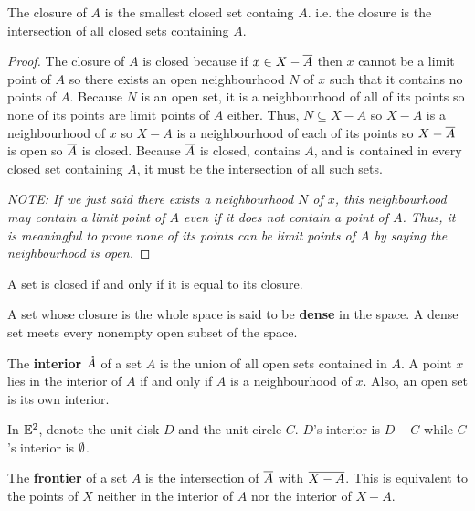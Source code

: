 \begin{theorem}
    The closure of $A$ is the smallest closed set containg $A$. i.e. the closure is the intersection of all closed sets containing $A$.
\end{theorem}
\begin{proof}
    The closure of $A$ is closed because if $x \in X-\overline{A}$ then $x$ cannot be a limit point of $A$ so there exists an open neighbourhood $N$ of $x$ such that it contains no points of $A$. Because $N$ is an open set, it is a neighbourhood of all of its points so none of its points are limit points of $A$ either. Thus, $N \subseteq X-A$ so $X-A$ is a neighbourhood of $x$ so $X-A$ is a neighbourhood of each of its points so $X-\overline{A}$ is open so $\overline{A}$ is closed. Because $\overline{A}$ is closed, contains $A$, and is contained in every closed set containing $A$, it must be the intersection of all such sets.

    \emph{NOTE: If we just said there exists a neighbourhood $N$ of $x$, this neighbourhood may contain a limit point of $A$ even if it does not contain a point of $A$. Thus, it is meaningful to prove none of its points can be limit points of $A$ by saying the neighbourhood is open.}
\end{proof}
\begin{corollary}
    A set is closed if and only if it is equal to its closure.
\end{corollary}
\begin{definition}[Dense]
    A set whose closure is the whole space is said to be \textbf{dense} in the space. A dense set meets every nonempty open subset of the space.
\end{definition}
\begin{definition}[Interior]
    The \textbf{interior} $\mathring{A}$ of a set $A$ is the union of all open sets contained in $A$. A point $x$ lies in the interior of $A$ if and only if $A$ is a neighbourhood of $x$. Also, an open set is its own interior.
\end{definition}
\begin{example}
    In $\mathbb{E}^2$, denote the unit disk $D$ and the unit circle $C$. $D$'s interior is $D-C$ while $C$'s interior is $\emptyset$. 
\end{example}
\begin{definition}[Frontier]
    The \textbf{frontier} of a set $A$ is the intersection of $\overline{A}$ with $\overline{X-A}$. This is equivalent to the points of $X$ neither in the interior of $A$ nor the interior of $X-A$.
\end{definition}
